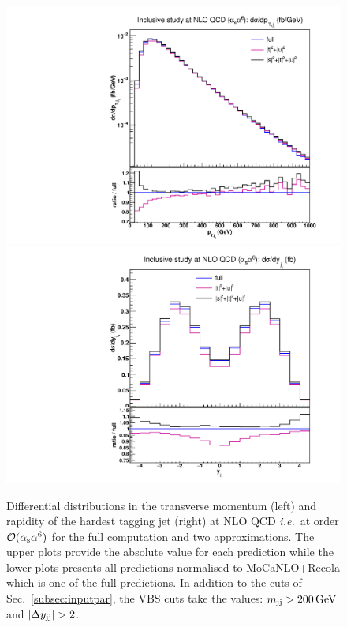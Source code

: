 \begin{figure}[hbt]
\centering
{\includegraphics[scale=0.35]{figures/scanfigures/ptj1_nlo.pdf}}
{\includegraphics[scale=0.35]{figures/scanfigures/yj1_nlo.pdf}}
\caption{Differential distributions in the transverse momentum (left) and rapidity of the hardest tagging jet (right) at NLO QCD \emph{i.e.}\ at order $\mathcal{O}(\alpha_\text{s}\alpha^6)$ for the full computation and two approximations.
The upper plots provide the absolute value for each prediction while the lower plots presents all predictions normalised to {\sc MoCaNLO}+{\sc Recola} which is one of the full predictions.
In addition to the cuts of Sec.~\ref{subsec:inputpar}, the VBS cuts take the values: $m_{\text{j}\text{j}}>200 \,\text{GeV}$ and $|\Delta y_{\Pj\Pj}|>2$.} 
\label{fig:mjjdyjj_1d_2}
\end{figure}

